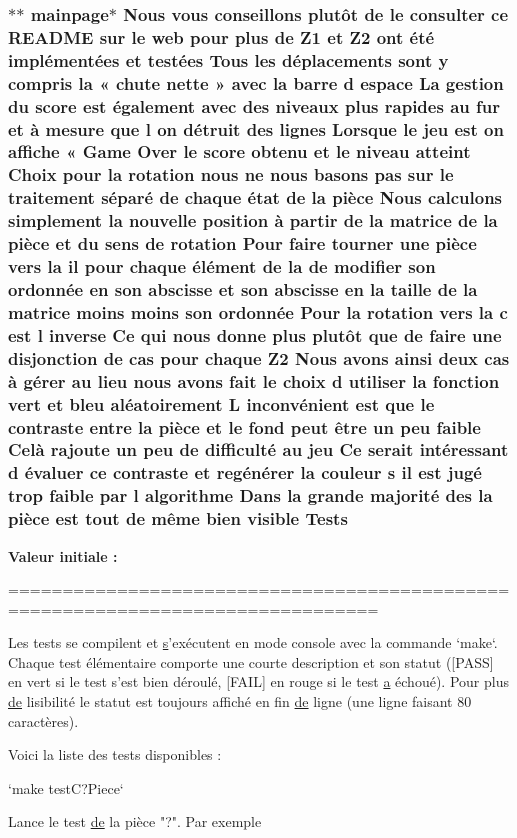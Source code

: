 \hypertarget{mainpage_8dox_a4882001a19bcd7c8d2a7ff234b6d4954}{
\subsubsection[{Tests}]{\setlength{\rightskip}{0pt plus 5cm}$\ast$$\ast$ mainpage$\ast$ Nous vous conseillons plutô{\bf t} {\bf de} le consulter ce R\-E\-A\-D\-M\-E sur le web pour plus {\bf de} {\bf Z1} et Z2 ont é{\bf t}é implémentées et testées Tous les déplacements sont {\bf y} compris la « chute nette » avec la barre d espace La gestion du score est également avec des niveaux plus rapides au fur et à mesure que l on détruit des lignes Lorsque le jeu est on affiche « Game Over le score obtenu et le niveau atteint Choix pour la rotation nous ne nous basons pas sur le traitement {\bf s}éparé {\bf de} chaque état {\bf de} la pièce Nous calculons simplement la nouvelle position à partir {\bf de} la {\bf matrice} {\bf de} la pièce et du {\bf sens} {\bf de} rotation Pour faire tourner une pièce vers la il pour chaque élément {\bf de} la {\bf de} modifier son ordonnée en son abscisse et son abscisse en la taille {\bf de} la {\bf matrice} moins moins son ordonnée Pour la rotation vers la {\bf c} est l inverse Ce qui nous donne plus plutô{\bf t} que {\bf de} faire une disjonction {\bf de} {\bf cas} pour chaque Z2 Nous avons ainsi deux {\bf cas} à {\bf g}érer au lieu nous avons fait le choix d utiliser la fonction vert et bleu aléatoirement L inconvénient est que le contraste entre la pièce et le fond peut être un peu faible Celà rajoute un peu {\bf de} difficulté au jeu Ce serait intéressant d évaluer ce contraste et regé{\bf n}érer la couleur {\bf s} il est jugé trop faible par l algorithme Dans la grande majorité des la pièce est tout {\bf de} {\bf m}ême bien visible Tests}}\label{mainpage_8dox_a4882001a19bcd7c8d2a7ff234b6d4954}
{\bfseries Valeur initiale \-:}
\begin{DoxyCode}
================================================================================

Les tests se compilent et \hyperlink{gl_8h_ad585a1393cfa368fa9dc3d8ebff640d5}{s}\textcolor{stringliteral}{'exécutent en mode console avec la commande `make`.}
\textcolor{stringliteral}{Chaque test élémentaire comporte une courte description et son statut ([PASS] en}
\textcolor{stringliteral}{vert si le test s'}est bien déroulé, [FAIL] en rouge si le test \hyperlink{glext_8h_ac8729153468b5dcf13f971b21d84d4e5}{a} échoué). Pour
plus \hyperlink{mainpage_8dox_ab37fa35e77d95c6d0d0ab620c97c3db8}{de} lisibilité le statut est toujours affiché en fin \hyperlink{mainpage_8dox_ab37fa35e77d95c6d0d0ab620c97c3db8}{de} ligne (une ligne
faisant 80 caractères).

Voici la liste des tests disponibles :



                              `make testC?Piece`

Lance le test \hyperlink{mainpage_8dox_ab37fa35e77d95c6d0d0ab620c97c3db8}{de} la pièce \textcolor{stringliteral}{"?"}. Par exemple
\end{DoxyCode}


